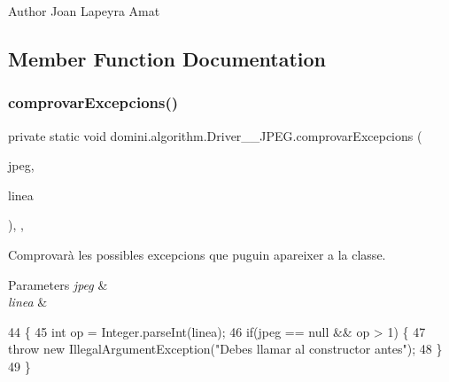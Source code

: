 \begin{DoxyAuthor}{Author}
Joan Lapeyra Amat 
\end{DoxyAuthor}


\subsection{Member Function Documentation}
\mbox{\label{classdomini_1_1algorithm_1_1Driver____JPEG_ae75883665dbbf55adaa8db46f2211c75}} 
\subsubsection{\texorpdfstring{comprovar\+Excepcions()}{comprovarExcepcions()}}
{\footnotesize\ttfamily private static void domini.\+algorithm.\+Driver\+\_\+\+\_\+\+J\+P\+E\+G.\+comprovar\+Excepcions (\begin{DoxyParamCaption}\item[{\hyperlink{classdomini_1_1algorithm_1_1JPEG}{J\+P\+EG}}]{jpeg,  }\item[{String}]{linea }\end{DoxyParamCaption})\hspace{0.3cm}{\ttfamily [inline]}, {\ttfamily [static]}, {\ttfamily [private]}}



Comprovarà les possibles excepcions que puguin apareixer a la classe. 


\begin{DoxyParams}{Parameters}
{\em jpeg} & \\
\hline
{\em linea} & \\
\hline
\end{DoxyParams}

\begin{DoxyCode}
44                                                                     \{
45         \textcolor{keywordtype}{int} op = Integer.parseInt(linea);
46         \textcolor{keywordflow}{if}(jpeg == null && op > 1) \{
47             \textcolor{keywordflow}{throw} \textcolor{keyword}{new} IllegalArgumentException(\textcolor{stringliteral}{"Debes llamar al constructor antes"});
48         \}
49     \}
\end{DoxyCode}
\mbox{\label{classdomini_1_1algorithm_1_1Driver____JPEG_a0e1370b743ad9782e31cb6b380dd60a5}} 
